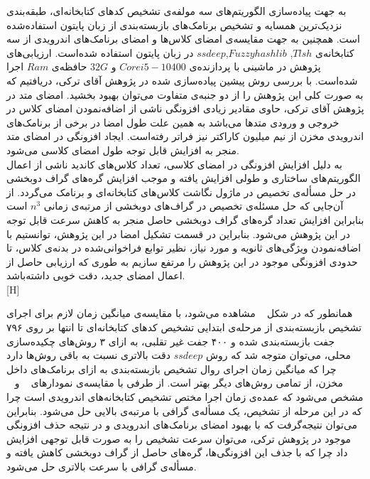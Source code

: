 به جهت پیاده‌سازی الگوریتم‌های سه مولفه‌ی تشخیص کد‌های کتابخانه‌ای، طبقه‌بندی نزدیک‌ترین همسایه و تشخیص برنامک‌های بازبسته‌بندی از زبان پایتون استفاده‌شده است. همچنین به جهت مقایسه‌ی امضای کلاس‌ها و امضای برنامک‌های اندرویدی از سه کتابخانه‌ی  $Tlsh$, $Fuzzyhashlib$,$ssdeep$ در زبان پایتون استفاده شده‌است. ارزیابی‌های پژوهش در ماشینی با پردازنده‌ی $Core i5- 10400$ و $32G$ حافظه‌ی $Ram$ اجرا شده‌است.  
\label{pairwisepure}
با بررسی روش پیشین پیاده‌سازی شده در پژوهش آقای ترکی، دریافتیم که به صورت کلی این پژوهش را از دو جنبه‌ی متفاوت می‌توان بهبود بخشید. امضای‌ متد در پژوهش آقای ترکی، حاوی مقادیر زیادی افزونگی ناشی از اضافه‌نمودن امضای کلاس در خروجی و ورودی متد‌ها می‌باشد به همین علت طول امضا در برخی از برنامک‌های اندرویدی مخزن از نیم میلیون کاراکتر نیز فراتر رفته‌است. ایجاد افزونگی در امضای متد منجر به افزایش قابل توجه طول امضای کلاسی می‌شود. \\
به دلیل افزایش افزونگی در امضای کلاسی، تعداد کلاس‌های کاندید ناشی از اعمال الگوریتم‌های ساختاری و طولی افزایش یافته و موجب افزایش گره‌های گراف دوبخشی در حل مسأله‌ی تخصیص در ماژول نگاشت کلاس‌های کتابخانه‌ای و برنامک می‌گردد.  از آن‌جایی که حل مسئله‌ی تخصیص در گراف‌های دوبخشی از مرتبه‌ی زمانی $n^3$
است بنابراین افزایش تعداد گره‌های گراف دوبخشی حاصل منجر به کاهش سرعت قابل توجه در این پژوهش می‌شود. بنابراین در قسمت تشکیل امضا در این پژوهش، توانستیم با اضافه‌نمودن ویژگی‌های ثانویه و مورد نیاز،‌ نظیر توابع فراخوانی‌شده در بدنه‌ی کلاس، تا حدودی افزونگی موجود در این پژوهش را مرتفع سازیم به طوری که ارزیابی حاصل از اعمال امضا‌ی جدید، دقت خوبی داشته‌باشد. \\
 [H]
\vspace{1em}


 همانطور که در شکل ~ مشاهده می‌شود، با مقایسه‌ی میانگین زمان لازم برای اجرای تشخیص بازبسته‌بندی از مرحله‌ی ابتدایی تشخیص کد‌های کتابخانه‌ای تا انتها بر روی ۷۹۶ جفت بازبسته‌بندی شده و ۴۰۰ جفت غیر تقلبی، به ازای ۳ روش‌های چکیده‌سازی محلی، می‌توان متوجه شد که روش $ssdeep$ دقت بالاتری نسبت به باقی روش‌ها دارد چرا که میانگین زمان اجرای روال تشخیص بازبسته‌بندی به ازای برنامک‌های داخل مخزن، از تمامی روش‌های دیگر بهتر است. از طرفی با مقایسه‌ی نمودار‌های ~ و ~ مشخص می‌شود که عمده‌ی زمان اجرا مختص تشخیص کتابخانه‌های اندرویدی است چرا که در این مرحله از تشخیص، یک مسأله‌ی گرافی با مرتبه‌ی بالایی حل می‌شود. بنابراین می‌توان نتیجه‌گرفت که با بهبود امضای برنامک‌های اندرویدی و در نتیجه حذف افزونگی موجود در پژوهش ترکی، می‌توان سرعت تشخیص را به صورت قابل توجهی افزایش داد چرا که با جذف این افزونگی‌ها، گره‌های حاصل از گراف دوبخشی کاهش یافته و مسأله‌ی گرافی با سرعت بالاتری حل می‌شود.
 
